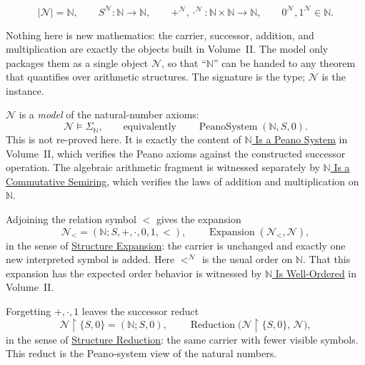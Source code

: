 \begin{remark*}
\[
|\mathcal{N}|=\mathbb{N},\qquad
S^{\mathcal{N}}:\mathbb{N}\to\mathbb{N},\qquad
+^{\mathcal{N}},\cdot^{\mathcal{N}}:\mathbb{N}\times\mathbb{N}\to\mathbb{N},
\qquad
0^{\mathcal{N}},1^{\mathcal{N}}\in\mathbb{N}.
\]
\end{remark*}\begin{remark*}[Interpretation]
Nothing here is new mathematics: the carrier, successor, addition, and
multiplication are exactly the objects built in Volume~II. The model only
packages them as a single object $\mathcal{N}$, so that ``$\mathbb{N}$'' can be
handed to any theorem that quantifies over arithmetic structures. The signature
is the type; $\mathcal{N}$ is the instance.
\end{remark*}

\begin{remark*}[Satisfaction]
$\mathcal{N}$ is a \emph{model} of the natural-number axioms:
\[
\mathcal{N}\models \Sigma_{\mathbb{N}},
\qquad\text{equivalently}\qquad
\operatorname{PeanoSystem}(\mathbb{N},S,0).
\]
This is not re-proved here. It is exactly the content of
\hyperref[thm:n-is-peano-system]{$\mathbb{N}$ Is a Peano System} in
Volume~II, which verifies the Peano axioms against the constructed successor
operation. The algebraic arithmetic fragment is witnessed separately by
\hyperref[thm:n-is-commutative-semiring]{$\mathbb{N}$ Is a Commutative Semiring},
which verifies the laws of addition and multiplication on $\mathbb{N}$.
\end{remark*}

\begin{remark*}
Adjoining the relation symbol $<$ gives the expansion
\[
\mathcal{N}_{<}=(\mathbb{N};S,+,\cdot,0,1,<),
\qquad
\operatorname{Expansion}(\mathcal{N}_{<},\mathcal{N}),
\]
in the sense of \hyperref[def:structure-expansion]{Structure Expansion}: the
carrier is unchanged and exactly one new interpreted symbol is added. Here
$<^{\mathcal{N}}$ is the usual order on $\mathbb{N}$. That this expansion has
the expected order behavior is witnessed by
\hyperref[thm:n-is-well-ordered]{$\mathbb{N}$ Is Well-Ordered} in Volume~II.
\end{remark*}

\begin{remark*}
Forgetting $+,\cdot,1$ leaves the successor reduct
\[
\mathcal{N}\!\restriction\!\{S,0\}
=
(\mathbb{N};S,0),
\qquad
\operatorname{Reduction}\!\bigl(\mathcal{N}\!\restriction\!\{S,0\},\,\mathcal{N}\bigr),
\]
in the sense of \hyperref[def:structure-reduction]{Structure Reduction}: the
same carrier with fewer visible symbols. This reduct is the Peano-system view
of the natural numbers.
\end{remark*}


